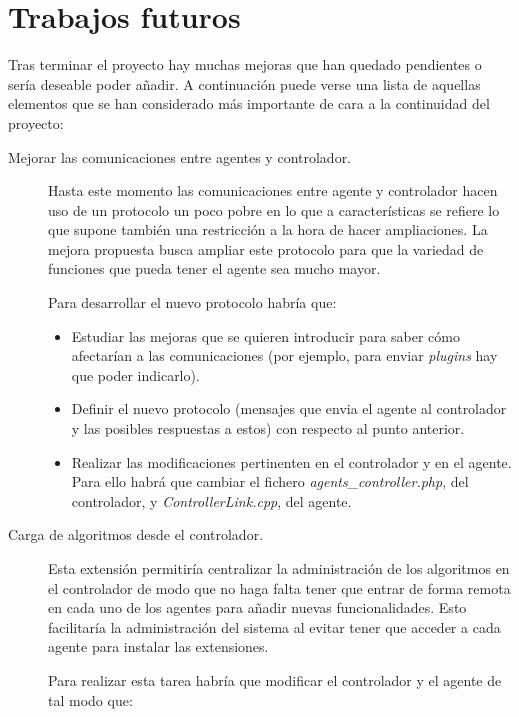 \chapter{Trabajos futuros}\label{cap6}

Tras terminar el proyecto hay muchas mejoras que han quedado pendientes o sería deseable poder añadir. A continuación puede verse una lista de aquellas elementos que se han considerado más importante de cara a la continuidad del proyecto:

\begin{description}
	\item[Mejorar las comunicaciones entre agentes y controlador.]

		Hasta este momento las comunicaciones entre agente y controlador hacen uso de un protocolo un poco pobre en lo que a características se refiere lo que supone también una restricción a la hora de hacer ampliaciones. La mejora propuesta busca ampliar este protocolo para que la variedad de funciones que pueda tener el agente sea mucho mayor.

		Para desarrollar el nuevo protocolo habría que:

		\begin{itemize}
			\item Estudiar las mejoras que se quieren introducir para saber cómo afectarían a las comunicaciones (por ejemplo, para enviar \emph{plugins} hay que poder indicarlo).

			\item Definir el nuevo protocolo (mensajes que envia el agente al controlador y las posibles respuestas a estos) con respecto al punto anterior.

			\item Realizar las modificaciones pertinenten en el controlador y en el agente. Para ello habrá que cambiar el fichero \emph{agents\_controller.php}, del controlador, y \emph{ControllerLink.cpp}, del agente.
		\end{itemize}

	\item[Carga de algoritmos desde el controlador.]

		Esta extensión permitiría centralizar la administración de los algoritmos en el controlador de modo que no haga falta tener que entrar de forma remota en cada uno de los agentes para añadir nuevas funcionalidades. Esto facilitaría la administración del sistema al evitar tener que acceder a cada agente para instalar las extensiones.

		Para realizar esta tarea habría que modificar el controlador y el agente de tal modo que:


\end{description}
